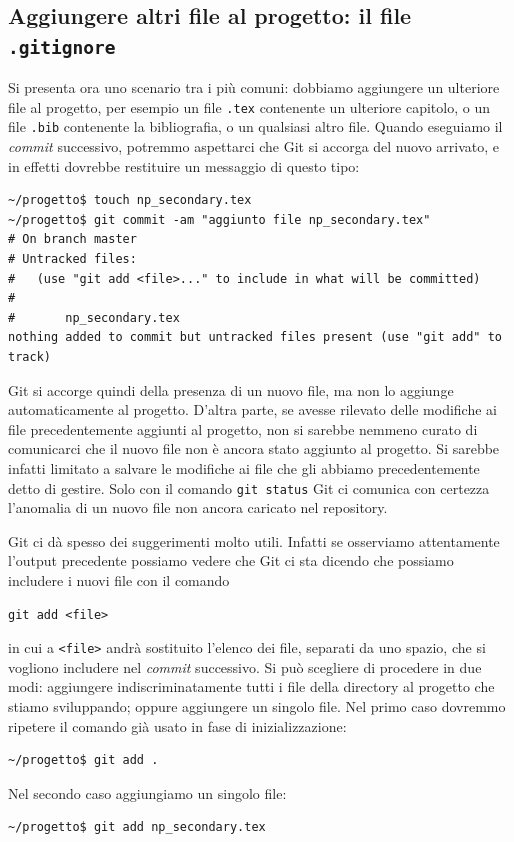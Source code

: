 \documentclass[a4paper,12pt,oneside]{article}
\begin{document}
\subsection{Aggiungere altri file al progetto: il file \lstinline|.gitignore|}
Si presenta ora uno scenario tra i più comuni: dobbiamo aggiungere un ulteriore
file al progetto, per esempio un file \lstinline|.tex| contenente un ulteriore
capitolo, o un file \lstinline|.bib| contenente la bibliografia, o un qualsiasi
altro file. Quando eseguiamo il \emph{commit} successivo, potremmo aspettarci
che Git si accorga del nuovo arrivato, e in effetti dovrebbe restituire un
messaggio di questo tipo:
\begin{lstlisting}
~/progetto$ touch np_secondary.tex
~/progetto$ git commit -am "aggiunto file np_secondary.tex"
# On branch master
# Untracked files:
#   (use "git add <file>..." to include in what will be committed)
#
#       np_secondary.tex
nothing added to commit but untracked files present (use "git add" to track)
\end{lstlisting}
Git si accorge quindi della presenza di un nuovo file, ma non lo aggiunge
automaticamente al progetto. D'altra parte, se avesse rilevato delle modifiche
ai file precedentemente aggiunti al progetto, non si sarebbe nemmeno curato di
comunicarci che il nuovo file non è ancora stato aggiunto al progetto. Si
sarebbe infatti limitato a salvare le modifiche ai file che gli abbiamo
precedentemente detto di gestire. Solo con il comando \lstinline|git status|
Git ci comunica con certezza l'anomalia di un nuovo file non ancora caricato nel
repository.

Git ci dà spesso dei suggerimenti molto utili.  Infatti se osserviamo
attentamente l'output precedente possiamo vedere che Git ci sta dicendo che
possiamo includere i nuovi file con il comando
\begin{lstlisting}
git add <file>
\end{lstlisting}
in cui a \lstinline|<file>| andrà sostituito l'elenco dei file, separati da
uno spazio, che si vogliono includere nel \emph{commit} successivo. Si può
scegliere di procedere in due modi: aggiungere indiscriminatamente tutti i file
della directory al progetto che stiamo sviluppando; oppure aggiungere un singolo
file. Nel primo caso dovremmo ripetere il comando già usato in fase di
inizializzazione:
\begin{lstlisting}
~/progetto$ git add .
\end{lstlisting}
Nel secondo caso aggiungiamo un singolo file:
\begin{lstlisting}
~/progetto$ git add np_secondary.tex
\end{lstlisting}
\end{document}
